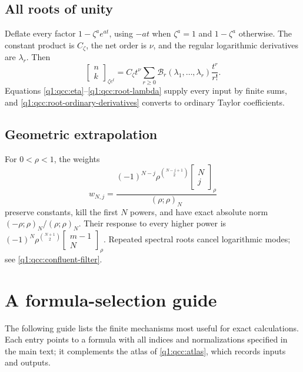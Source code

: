 \documentclass[11pt,a4paper,oneside,openany]{book}
\theoremstyle{definition}
\theoremstyle{remark}
\newcommand{\GB}[3][q]{\begin{bmatrix}#2\\#3\end{bmatrix}_{#1}}
\newcommand{\Y}[1]{\mathcal B_{#1}}
\begin{document}
\section*{All roots of unity}
Deflate every factor \(1-\zeta^ae^{at}\), using
\(-at\) when \(\zeta^a=1\) and \(1-\zeta^a\) otherwise. The constant
product is \(C_\zeta\), the net order is \(\nu\), and the regular
logarithmic derivatives are \(\lambda_r\). Then
\[
 \GB[\zeta e^t]nk=C_\zeta t^\nu
      \sum_{r\ge0}\Y r(\lambda_1,\ldots,\lambda_r)\frac{t^r}{r!}.
\]
Equations \eqref{q1:qcc:eta}--\eqref{q1:qcc:root-lambda} supply every input by
finite sums, and \eqref{q1:qcc:root-ordinary-derivatives} converts to ordinary
Taylor coefficients.

\section*{Geometric extrapolation}
For \(0<\rho<1\), the weights
\[
 w_{N,j}=\frac{(-1)^{N-j}\rho^{\binom{N-j+1}{2}}
                  \GB[\rho]Nj}{(\rho;\rho)_N}
\]
preserve constants, kill the first \(N\) powers, and have exact absolute norm
\(( -\rho;\rho)_N/(\rho;\rho)_N\). Their response to every higher power
is \((-1)^N\rho^{\binom{N+1}{2}}\GB[\rho]{m-1}{N}\).
Repeated spectral roots cancel logarithmic modes; see
\cref{q1:qcc:confluent-filter}.

\chapter{A formula-selection guide}
\label{q3:app:guide}
The following guide lists the finite mechanisms most useful for exact
calculations. Each entry points to a formula with all indices and
normalizations specified in the main text; it complements the atlas of
\cref{q1:qcc:atlas}, which records inputs and outputs.
\end{document}
